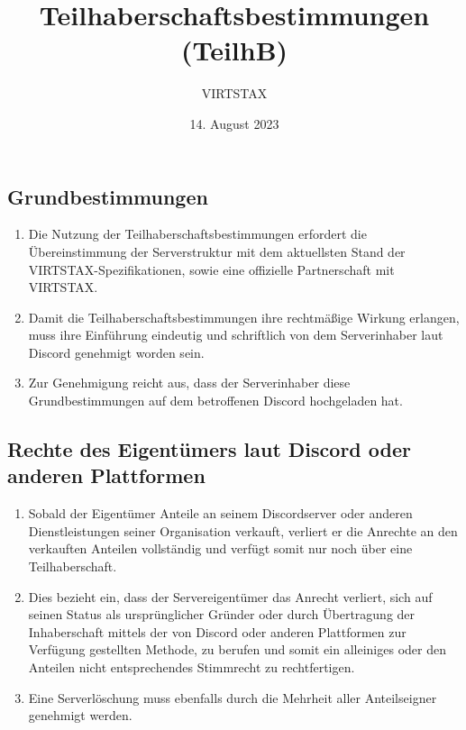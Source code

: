 \documentclass{article}
\title{Teilhaberschaftsbestimmungen (TeilhB)}
\author{VIRTSTAX}
\date{14. August 2023}
\begin{document}
\maketitle
\newpage
\tableofcontents
\newpage
\subsection{Grundbestimmungen}
\begin{enumerate}[(1)]
	\item Die Nutzung der Teilhaberschaftsbestimmungen erfordert die Übereinstimmung der Serverstruktur mit dem aktuellsten Stand der VIRTSTAX-Spezifikationen, sowie eine offizielle Partnerschaft mit VIRTSTAX.\@
	\item Damit die Teilhaberschaftsbestimmungen ihre rechtmäßige Wirkung erlangen, muss ihre Einführung eindeutig und schriftlich von dem Serverinhaber laut Discord genehmigt worden sein.
	\item Zur Genehmigung reicht aus, dass der Serverinhaber diese Grundbestimmungen auf dem betroffenen Discord hochgeladen hat.
\end{enumerate}

\subsection{Rechte des Eigentümers laut Discord oder anderen Plattformen}
\begin{enumerate}[(1)]
	\item Sobald der Eigentümer Anteile an seinem Discordserver oder anderen Dienstleistungen seiner Organisation verkauft, verliert er die Anrechte an den verkauften Anteilen vollständig und verfügt somit nur noch über eine Teilhaberschaft.
	\item Dies bezieht ein, dass der Servereigentümer das Anrecht verliert, sich auf seinen Status als ursprünglicher Gründer oder durch Übertragung der Inhaberschaft mittels der von Discord oder anderen Plattformen zur Verfügung gestellten Methode, zu berufen und somit ein alleiniges oder den Anteilen nicht entsprechendes Stimmrecht zu rechtfertigen.
	\item Eine Serverlöschung muss ebenfalls durch die Mehrheit aller Anteilseigner genehmigt werden.
\end{enumerate}
\end{document}
